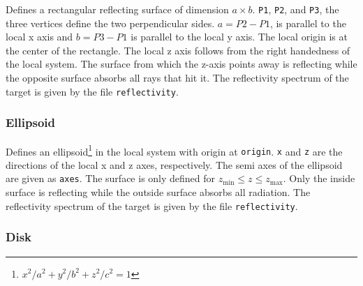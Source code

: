 \documentclass[10pt,a4paper,titlepage]{article}
\begin{document}





Defines a rectangular reflecting surface of dimension $a \times b$. {\tt P1}, {\tt P2}, and {\tt P3}, the three vertices define the two perpendicular sides. $a=P2-P1$, is parallel to the local x axis and $b=P3 - P1$ is parallel to the local y axis. The local origin is at the center of the rectangle. The local z axis follows from the right handedness of the local system. The surface from which the z-axis points away is reflecting while the opposite surface absorbs all rays that hit it. The reflectivity spectrum of the target is given by the file {\tt reflectivity}.

\subsubsection{Ellipsoid}










Defines an ellipsoid\footnote{${x^2}/{a^2}+{y^2}/{b^2}+{z^2}/{c^2}=1$} in the local system with origin at {\tt origin}. {\tt x} and {\tt z} are the directions of the local x and z axes, respectively. The semi axes of the ellipsoid are given as {\tt axes}. The surface is only defined for $z_\mathrm{min} \leq z \leq z_\mathrm{max}$. Only the inside surface is reflecting while the outside surface absorbs all radiation. The reflectivity spectrum of the target is given by the file {\tt reflectivity}.

\subsubsection{Disk}
\end{document}
